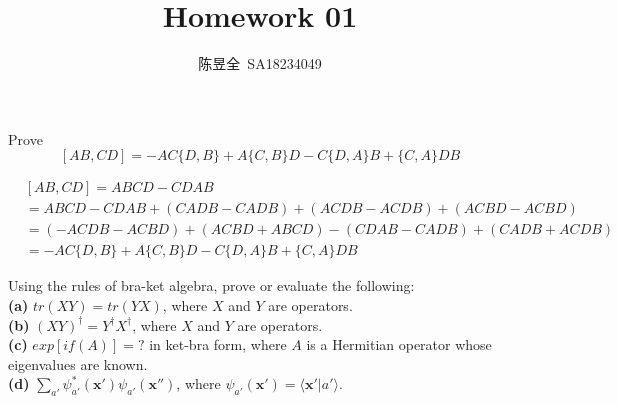 \documentclass[UTF8,12pt]{article} %
\makeatletter
\newenvironment{proof}[1][\protect\proofname]{\par
\normalfont\topsep6\p@\@plus6\p@\relax
\trivlist
\itemindent\parindent
\item[\hskip\labelsep
\scshape
#1]\ignorespaces
}{%
\endtrivlist\@endpefalse
}
\renewcommand{\proofname}{\it{Solution}}
\makeatother
\begin{document}
\title{Homework 01}
\author{陈昱全~SA18234049}
\date{} %
\maketitle

\begin{exercise}{1.1}{}
Prove $$[AB,CD] = -AC\{D,B\} + A\{C,B\}D - C\{D,A\}B + \{C,A\}DB$$
\end{exercise}

\begin{proof}[Proof]
\begin{align*}
&[AB,CD] = ABCD - CDAB \\
&= ABCD - CDAB + (CADB - CADB) + (ACDB - ACDB) + (ACBD - ACBD) \\
&= (- ACDB - ACBD) + (ACBD + ABCD) - (CDAB - CADB) + (CADB + ACDB) \\
&= -AC\{D,B\} + A\{C,B\}D - C\{D,A\}B + \{C,A\}DB
\end{align*}
\end{proof}

\begin{exercise}{1.4}{}
Using the rules of bra-ket algebra, prove or evaluate the following:\\
\textbf{(a)} $tr(XY) = tr(YX)$, where $X$ and $Y$ are operators.\\
\textbf{(b)} $(XY)^\dagger = Y^\dagger X^\dagger$, where $X$ and $Y$ are operators.\\
\textbf{(c)} $exp[if(A)] = ?$ in ket-bra form, where $A$ is a Hermitian operator whose eigenvalues are known.\\
\textbf{(d)} $\sum_{a'}\psi_{a'}^{*}(\bm{x'})\psi_{a'}(\bm{x''})$, where $\psi_{a'}(\bm{x'}) = \langle\bm{x'}|a'\rangle$.
\end{exercise}
\end{document}
